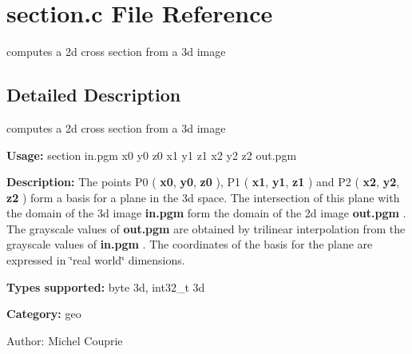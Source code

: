 \section{section.c File Reference}
\label{section_8c}
computes a 2d cross section from a 3d image 



\subsection{Detailed Description}
computes a 2d cross section from a 3d image 

{\bf Usage:} section in.pgm x0 y0 z0 x1 y1 z1 x2 y2 z2 out.pgm

{\bf Description:} The points P0 ( {\bf x0}, {\bf y0}, {\bf z0} ), P1 ( {\bf x1}, {\bf y1}, {\bf z1} ) and P2 ( {\bf x2}, {\bf y2}, {\bf z2} ) form a basis for a plane in the 3d space. The intersection of this plane with the domain of the 3d image {\bf in.pgm} form the domain of the 2d image {\bf out.pgm} . The grayscale values of {\bf out.pgm} are obtained by trilinear interpolation from the grayscale values of {\bf in.pgm} . The coordinates of the basis for the plane are expressed in \char`\"{}real world\char`\"{} dimensions.

{\bf Types supported:} byte 3d, int32\_\-t 3d

{\bf Category:} geo

\begin{Desc}
\item[Author:]Michel Couprie \end{Desc}
